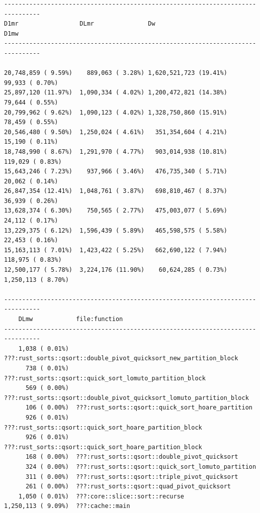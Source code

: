 \documentclass{article}
\begin{document}
\begin{verbatim}
-------------------------------------------------------------------------------- 
D1mr                 DLmr               Dw                         D1mw           
--------------------------------------------------------------------------------

20,748,859 ( 9.59%)    889,063 ( 3.28%) 1,620,521,723 (19.41%)     99,933 ( 0.70%)      
25,897,120 (11.97%)  1,090,334 ( 4.02%) 1,200,472,821 (14.38%)     79,644 ( 0.55%)        
20,799,962 ( 9.62%)  1,090,123 ( 4.02%) 1,328,750,860 (15.91%)     78,459 ( 0.55%)        
20,546,480 ( 9.50%)  1,250,024 ( 4.61%)   351,354,604 ( 4.21%)     15,190 ( 0.11%)        
18,748,990 ( 8.67%)  1,291,970 ( 4.77%)   903,014,938 (10.81%)    119,029 ( 0.83%)        
15,643,246 ( 7.23%)    937,966 ( 3.46%)   476,735,340 ( 5.71%)     20,062 ( 0.14%)        
26,847,354 (12.41%)  1,048,761 ( 3.87%)   698,810,467 ( 8.37%)     36,939 ( 0.26%)        
13,628,374 ( 6.30%)    750,565 ( 2.77%)   475,003,077 ( 5.69%)     24,112 ( 0.17%)        
13,229,375 ( 6.12%)  1,596,439 ( 5.89%)   465,598,575 ( 5.58%)     22,453 ( 0.16%)        
15,163,113 ( 7.01%)  1,423,422 ( 5.25%)   662,690,122 ( 7.94%)    118,975 ( 0.83%)      
12,500,177 ( 5.78%)  3,224,176 (11.90%)    60,624,285 ( 0.73%)  1,250,113 ( 8.70%)  

--------------------------------------------------------------------------------
    DLmw            file:function
--------------------------------------------------------------------------------
    1,038 ( 0.01%)  ???:rust_sorts::qsort::double_pivot_quicksort_new_partition_block
      738 ( 0.01%)  ???:rust_sorts::qsort::quick_sort_lomuto_partition_block
      569 ( 0.00%)  ???:rust_sorts::qsort::double_pivot_quicksort_lomuto_partition_block
      106 ( 0.00%)  ???:rust_sorts::qsort::quick_sort_hoare_partition
      926 ( 0.01%)  ???:rust_sorts::qsort::quick_sort_hoare_partition_block
      926 ( 0.01%)  ???:rust_sorts::qsort::quick_sort_hoare_partition_block
      168 ( 0.00%)  ???:rust_sorts::qsort::double_pivot_quicksort
      324 ( 0.00%)  ???:rust_sorts::qsort::quick_sort_lomuto_partition
      311 ( 0.00%)  ???:rust_sorts::qsort::triple_pivot_quicksort
      261 ( 0.00%)  ???:rust_sorts::qsort::quad_pivot_quicksort
    1,050 ( 0.01%)  ???:core::slice::sort::recurse
1,250,113 ( 9.09%)  ???:cache::main
\end{verbatim}
\end{document}
